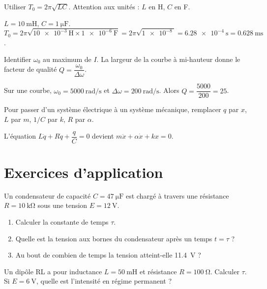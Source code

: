 Utiliser $T_0 = 2\pi\sqrt{LC}$. Attention aux unités : $L$ en \si{\henry}, $C$ en \si{\farad}.

\begin{exemple}
$L = \SI{10}{\milli\henry}$, $C = \SI{1}{\micro\farad}$. $T_0 = 2\pi\sqrt{\SI{10e-3}{\henry} \times \SI{1e-6}{\farad}} = 2\pi\sqrt{\SI{1e-8}{}} = \SI{6.28e-4}{\second} = \SI{0.628}{\milli\second}$.
\end{exemple}

Identifier $\omega_0$ au maximum de $I$. La largeur de la courbe à mi-hauteur donne le facteur de qualité $Q = \dfrac{\omega_0}{\Delta\omega}$.

\begin{exemple}
Sur une courbe, $\omega_0 = \SI{5000}{\radian\per\second}$ et $\Delta\omega = \SI{200}{\radian\per\second}$. Alors $Q = \dfrac{5000}{200} = 25$.
\end{exemple}

Pour passer d’un système électrique à un système mécanique, remplacer $q$ par $x$, $L$ par $m$, $1/C$ par $k$, $R$ par $\alpha$.

\begin{exemple}
L’équation $L\ddot{q} + R\dot{q} + \dfrac{q}{C} = 0$ devient $m\ddot{x} + \alpha\dot{x} + kx = 0$.
\end{exemple}

\section{Exercices d’application}


\exo{} Un condensateur de capacité $C = \SI{47}{\micro\farad}$ est chargé à travers une résistance $R = \SI{10}{\kilo\ohm}$ sous une tension $E = \SI{12}{\volt}$.
\begin{enumerate}[label=\alph*)]
  \item Calculer la constante de temps $\tau$.
  \item Quelle est la tension aux bornes du condensateur après un temps $t = \tau$ ?
  \item Au bout de combien de temps la tension atteint-elle \SI{11.4}{\volt} ?
\end{enumerate}

\exo{} Un dipôle RL a pour inductance $L = \SI{50}{\milli\henry}$ et résistance $R = \SI{100}{\ohm}$. Calculer $\tau$. Si $E = \SI{6}{\volt}$, quelle est l’intensité en régime permanent ?

